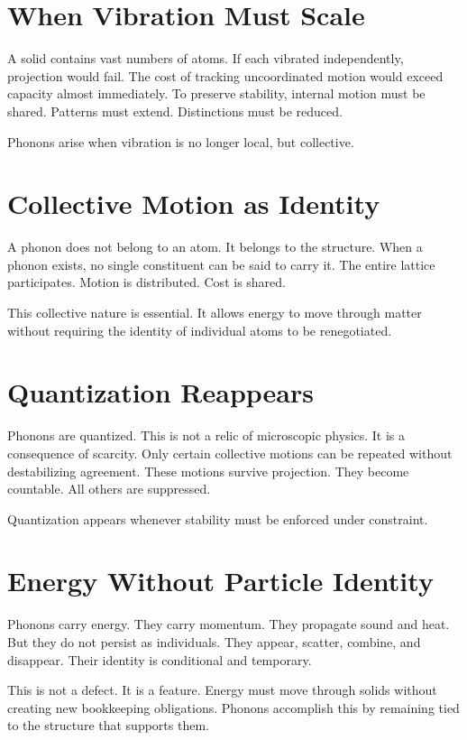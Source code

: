 \documentclass[11pt,twoside,openright]{book}
\begin{document}
\section*{When Vibration Must Scale}

A solid contains vast numbers of atoms. If each vibrated independently, projection would fail. The cost of tracking uncoordinated motion would exceed capacity almost immediately. To preserve stability, internal motion must be shared. Patterns must extend. Distinctions must be reduced.

Phonons arise when vibration is no longer local, but collective.

\section*{Collective Motion as Identity}

A phonon does not belong to an atom. It belongs to the structure. When a phonon exists, no single constituent can be said to carry it. The entire lattice participates. Motion is distributed. Cost is shared.

This collective nature is essential. It allows energy to move through matter without requiring the identity of individual atoms to be renegotiated.

\section*{Quantization Reappears}

Phonons are quantized. This is not a relic of microscopic physics. It is a consequence of scarcity. Only certain collective motions can be repeated without destabilizing agreement. These motions survive projection. They become countable. All others are suppressed.

Quantization appears whenever stability must be enforced under constraint.

\section*{Energy Without Particle Identity}

Phonons carry energy. They carry momentum. They propagate sound and heat. But they do not persist as individuals. They appear, scatter, combine, and disappear. Their identity is conditional and temporary.

This is not a defect. It is a feature. Energy must move through solids without creating new bookkeeping obligations. Phonons accomplish this by remaining tied to the structure that supports them.
\end{document}
